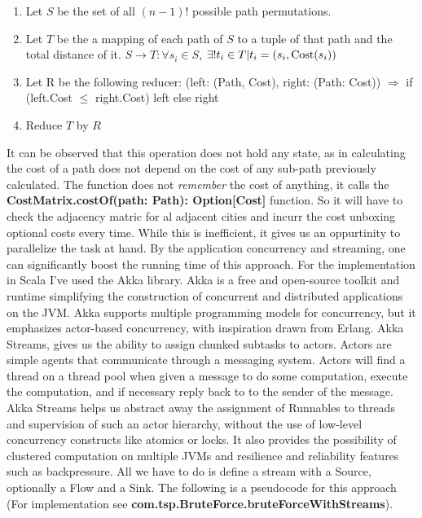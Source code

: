 \documentclass[11pt]{article}
\begin{document}
\begin{enumerate}
\item Let $S$ be the set of all $(n-1)!$ possible path permutations.
\item Let $T$ be the a mapping of each path of $S$ to a tuple of that path and the total distance of it. $ S\rightarrow T: \forall s_i \in S $, $ \exists! t_i \in T|t_i =(s_i, \textup{Cost}(s_i))$
\item Let R be the following reducer: (left: (Path, Cost), right: (Path: Cost)) $\Rightarrow$ if (left.Cost $\leq$ right.Cost) left else right
\item Reduce $T$ by $R$
\end{enumerate}


It can be observed that this operation does not hold any state, as in calculating the cost of a path does not depend on the cost of any sub-path previously calculated. The function does not \textit{remember} the cost of anything, it calls the \textbf{CostMatrix.costOf(path: Path): Option[Cost]} function. So it will have to check the adjacency matric for al adjacent cities and incurr the cost unboxing optional costs every time. While this is inefficient, it gives us an oppurtinity to parallelize the task at hand. By the application concurrency and streaming, one can significantly boost the running time of this approach. For the implementation in Scala I've used the Akka library. Akka is a free and open-source toolkit and runtime simplifying the construction of concurrent and distributed applications on the JVM. Akka supports multiple programming models for concurrency, but it emphasizes actor-based concurrency, with inspiration drawn from Erlang. Akka Streams, gives us the ability to assign chunked subtasks to actors. Actors are simple agents that communicate through a messaging system. Actors will find a thread on a thread pool when given a message to do some computation, execute the computation, and if necessary reply back to to the sender of the message. Akka Streams helps us abstract away the assignment of Runnables to threads and supervision of such an actor hierarchy, without the use of low-level concurrency constructs like atomics or locks. It also provides the possibility of clustered computation on multiple JVMs and resilience and reliability features such as backpressure. All we have to do is define a stream with a Source, optionally a Flow and a Sink. The following is a pseudocode for this approach (For implementation see \textbf{com.tsp.BruteForce.bruteForceWithStreams}).
\end{document}
